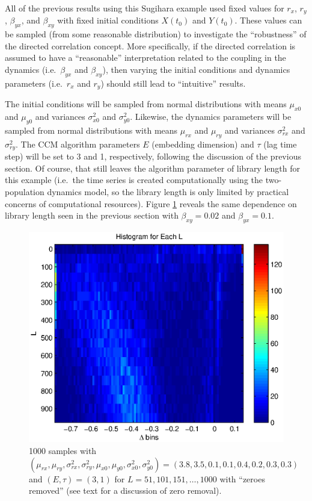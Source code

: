 \documentclass[a4paper,11pt]{article}
\begin{document}
All of the previous results using this Sugihara example used fixed values for $r_x$, $r_y$, $\beta_{yx}$, and $\beta_{xy}$ with fixed initial conditions $X(t_0)$ and $Y(t_0)$.  These values can be sampled (from some reasonable distribution) to investigate the ``robustness'' of the directed correlation concept.  More specifically, if the directed correlation is assumed to have a ``reasonable'' interpretation related to the coupling in the dynamics (i.e.\ $\beta_{yx}$ and $\beta_{xy}$), then varying the initial conditions and dynamics parameters (i.e.\ $r_x$ and $r_y$) should still lead to ``intuitive'' results.  

The initial conditions will be sampled from normal distributions with means $\mu_{x0}$ and $\mu_{y0}$ and variances $\sigma^2_{x0}$ and $\sigma^2_{y0}$.  Likewise, the dynamics parameters will be sampled from normal distributions with means $\mu_{rx}$ and $\mu_{ry}$ and variances $\sigma^2_{rx}$ and $\sigma^2_{ry}$.  The CCM algorithm parameters $E$ (embedding dimension) and $\tau$ (lag time step) will be set to 3 and 1, respectively, following the discussion of the previous section.  Of course, that still leaves the algorithm parameter of library length for this example (i.e.\ the time series is created computationally using the two-population dynamics model, so the library length is only limited by practical concerns of computational resources).  Figure \ref{fig:TwoPopDynvLL} reveals the same dependence on library length seen in the previous section with $\beta_{xy}=0.02$ and $\beta_{yx}=0.1$.
\begin{figure}[h!t]
\centering
\label{fig:TwoPopDynvLL}
\includegraphics[scale=0.55]{TwoPopDynvLL.eps}
\caption{1000 samples with $\left(\mu_{rx},\mu_{ry},\sigma^2_{rx},\sigma^2_{ry},\mu_{x0},\mu_{y0},\sigma^2_{x0},\sigma^2_{y0}\right) = \left(3.8,3.5,0.1,0.1,0.4,0.2,0.3,0.3\right)$ and $\left(E,\tau\right)=\left(3,1\right)$ for $L=51, 101, 151, \ldots, 1000$ with ``zeroes removed'' (see text for a discussion of zero removal).}
\end{figure}
\end{document}
